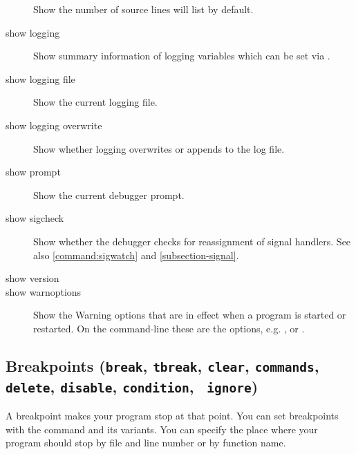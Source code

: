 \begin{description}
Show the number of source lines  will list by default.

\item[show logging]

Show summary information of logging variables which can be set via
.

\item[show logging file]

Show the current logging file.

\item[show logging overwrite]

Show whether logging overwrites or appends to the log file.

\item[show prompt]

Show the current debugger prompt.

\item[show sigcheck]

Show whether the debugger checks for reassignment of signal handlers.
See also \ref{command:sigwatch} and \ref{subsection-signal}.

%


\item[show version]

\item[show warnoptions]

Show the Warning options that are in effect when a program is started
or restarted. On the command-line these are the  options,
e.g. , or .

\end{description}

\subsection{Breakpoints ({\tt break}, {\tt tbreak}, {\tt clear},
  {\tt commands}, {\tt delete}, {\tt disable}, {\tt condition}, {\tt
  ignore})\label{subsubsection-brkpts}}

 A breakpoint makes your program stop at that
point. You can set breakpoints with the  command and its
variants. You can specify the place where your program should stop by
file and line number or by function name.

